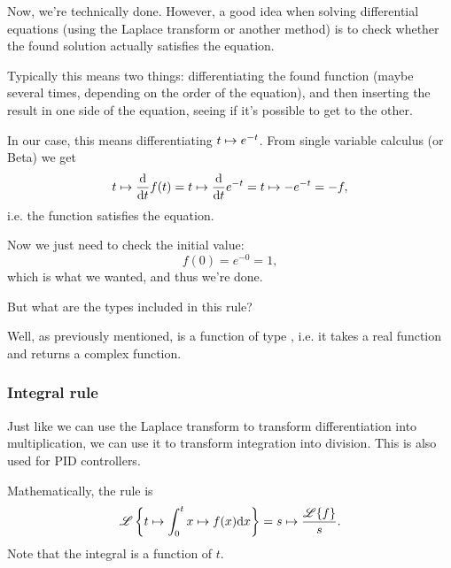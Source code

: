 \begin{solution}
Now, we're technically done. However, a good idea when solving differential
equations (using the Laplace transform or another method) is to check whether
the found solution actually satisfies the equation.

Typically this means two things: differentiating the found function (maybe
several times, depending on the order of the equation), and then inserting the
result in one side of the equation, seeing if it's possible to get to the other.

In our case, this means differentiating $t \mapsto e^{-t}$. From single variable
calculus (or Beta) we get
\begin{equation*}
 t \mapsto \dv{t} f(t) =  t \mapsto \dv{t}e^{-t}= t \mapsto -e^{-t} = -f,
\end{equation*}
i.e. the function satisfies the equation.

Now we just need to check the initial value:
\begin{equation*}
  f(0) = e^{-0} = 1,
\end{equation*}
which is what we wanted, and thus we're done.
\end{solution}

But what are the types included in this rule? 

Well, as previously mentioned,  is a function of type , i.e. it takes a real function and returns a complex function. 
\subsubsection{Integral rule}
Just like we can use the Laplace transform to transform differentiation into
multiplication, we can use it to transform integration into division. This is
also used for PID controllers.

Mathematically, the rule is
\begin{equation*}
 \mathscr{L} \left\{t \mapsto \int_0^t x \mapsto f(x) \dd x\right\}  = s \mapsto \frac{\mathscr{L}\{f\}}{s}.
\end{equation*}
Note that the integral is a function of $t$. 


